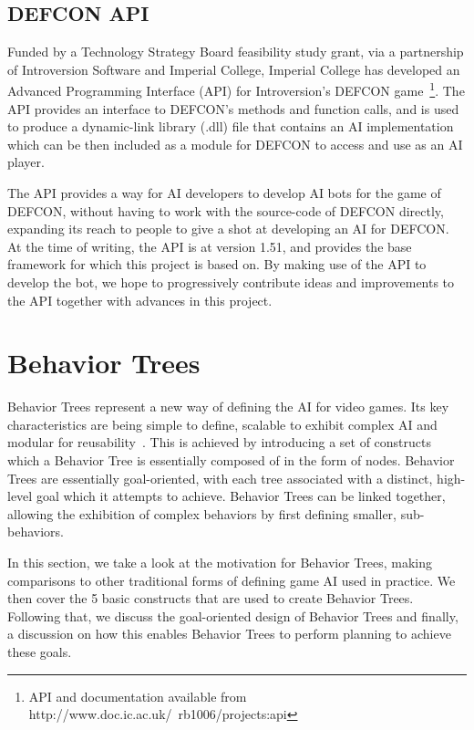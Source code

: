         \subsection{DEFCON API}   
        Funded by a Technology Strategy Board feasibility study grant, via a partnership of Introversion Software and Imperial College, Imperial College has developed an Advanced Programming Interface (API) for Introversion's DEFCON game~\footnote{API and documentation available from http://www.doc.ic.ac.uk/~rb1006/projects:api}. The API provides an interface to DEFCON's methods and function calls, and is used to produce a dynamic-link library (.dll) file that contains an AI implementation which can be then included as a module for DEFCON to access and use as an AI player.

        The API provides a way for AI developers to develop AI bots for the game of DEFCON, without having to work with the source-code of DEFCON directly, expanding its reach to people to give a shot at developing an AI for DEFCON. At the time of writing, the API is at version 1.51, and provides the base framework for which this project is based on. By making use of the API to develop the bot, we hope to progressively contribute ideas and improvements to the API together with advances in this project.       
    
    \newpage
    
    \section{Behavior Trees}
    \label{sec:behaviortrees}
        
        Behavior Trees represent a new way of defining the AI for video games. Its key characteristics are being simple to define, scalable to exhibit complex AI and modular for reusability~\cite{understandingbts}. This is achieved by introducing a set of constructs which a Behavior Tree is essentially composed of in the form of nodes. Behavior Trees are essentially goal-oriented, with each tree associated with a distinct, high-level goal which it attempts to achieve. Behavior Trees can be linked together, allowing the exhibition of complex behaviors by first defining smaller, sub-behaviors. 
        
        In this section, we take a look at the motivation for Behavior Trees, making comparisons to other traditional forms of defining game AI used in practice. We then cover the 5 basic constructs that are used to create Behavior Trees. Following that, we discuss the goal-oriented design of Behavior Trees and finally, a discussion on how this enables Behavior Trees to perform planning to achieve these goals.
        
